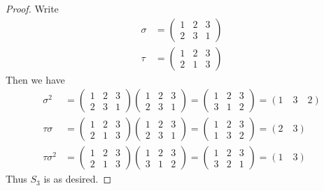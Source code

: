\documentclass{article}
\begin{document}
\begin{itemize}
\begin{itemize}
\begin{proof}
					Write 
					\begin{align*}
						\sigma &= \begin{pmatrix}
							1 & 2 & 3 \\
							2 & 3 & 1
						\end{pmatrix} \\
						\tau &= \begin{pmatrix}
							1 & 2 & 3 \\
							2 & 1 & 3
						\end{pmatrix}
					\end{align*}
					Then we have
					\begin{align*}
						\sigma^2 &= \begin{pmatrix}
							1 & 2 & 3 \\
							2 & 3 & 1
						\end{pmatrix} \begin{pmatrix}
							1 & 2 & 3 \\
							2 & 3 & 1
						\end{pmatrix} = \begin{pmatrix}
							1 & 2 & 3 \\
							3 & 1 & 2
						\end{pmatrix} = (1\quad3\quad2) \\
						\tau\sigma &= \begin{pmatrix}
							1 & 2 & 3 \\
							2 & 1 & 3 
						\end{pmatrix} \begin{pmatrix}
							1 & 2 & 3 \\
							2 & 3 & 1
						\end{pmatrix} = \begin{pmatrix}
							1 & 2 & 3 \\
							1 & 3 & 2
						\end{pmatrix} = (2\quad3) \\
						\tau\sigma^2 &= \begin{pmatrix}
							1 & 2 & 3 \\
							2 & 1 & 3
						\end{pmatrix} \begin{pmatrix}
							1 & 2 & 3 \\
							3 & 1 & 2
						\end{pmatrix} = \begin{pmatrix}
							1 & 2 & 3 \\
							3 & 2 & 1
						\end{pmatrix} = (1\quad3)
					\end{align*} Thus $S_3$ is as desired.


\end{proof}
\end{itemize}
\end{itemize}
\end{document}
